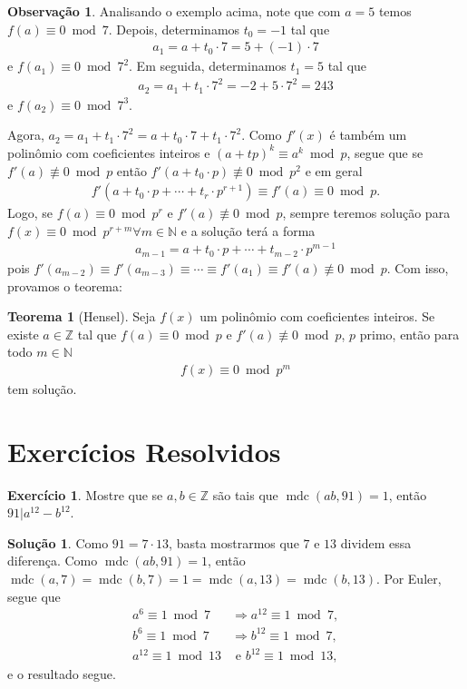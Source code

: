 \documentclass[a4paper,11pt,twoside, leqno]{article}
\DeclareMathOperator{\mdc}{mdc}
\theoremstyle{definition}
\newtheorem{theorem}{Teorema}[section]
\newtheorem{remark}{Observação}[section]
\newtheorem{exercise}{Exercício}
\newtheorem*{solution}{Solução}
\begin{document}
\begin{remark}
	Analisando o exemplo acima, note que com $a = 5$ temos $f(a)\equiv 0\bmod 7$. Depois, determinamos $t_0 = -1$ tal que 
	\begin{align*}
	a_1 = a + t_0\cdot 7 = 5 + (-1)\cdot 7
	\end{align*}
	e $f(a_1)\equiv 0\bmod 7^2$. Em seguida, determinamos $t_1 = 5$ tal que
	\begin{align*}
	a_2 = a_1 + t_1\cdot 7^2 = -2 + 5\cdot 7^2 = 243
	\end{align*}
	e $f(a_2)\equiv 0\bmod 7^3$. 
	\par\vspace{0.3cm} Agora, $a_2 = a_1 + t_1\cdot 7^2 = a + t_0\cdot 7 + t_1\cdot 7^2$. Como $f'(x)$ é também um polinômio com coeficientes inteiros e $(a + tp)^k\equiv a^k\bmod p$, segue que se $f'(a)\not\equiv 0\bmod p$ então $f'(a + t_0\cdot p)\not\equiv 0\bmod p^2$ e em geral
	\begin{align*}
	f'(a + t_0\cdot p + \cdots + t_r\cdot p^{r+1}) \equiv f'(a)\equiv 0\bmod p.
	\end{align*}
	Logo, se $f(a)\equiv 0\bmod p^r$ e $f'(a)\not\equiv 0\bmod p$, sempre teremos solução para $f(x)\equiv 0\bmod p^{r+m}\forall m\in\mathbb{N}$ e a solução terá a forma
	\begin{align*}
	a_{m-1} = a + t_0\cdot p + \cdots + t_{m-2}\cdot p^{m-1}
	\end{align*}
	pois $f'(a_{m-2})\equiv f'(a_{m-3})\equiv\cdots\equiv f'(a_1)\equiv f'(a)\not\equiv 0\bmod p$. Com isso, provamos o teorema:
\end{remark}
\begin{theorem}[Hensel]
	\label{teorema hensel}
	Seja $f(x)$ um polinômio com coeficientes inteiros. Se existe $a\in\mathbb{Z}$ tal que $f(a)\equiv 0\bmod p$ e $f'(a)\not\equiv 0\bmod p$, $p$ primo, então para todo $m\in\mathbb{N}$
	\begin{align*}
	f(x)\equiv 0\bmod p^m
	\end{align*}
	tem solução.
\end{theorem}
\section{Exercícios Resolvidos}
\begin{exercise}
	Mostre que se $a,b\in\mathbb{Z}$ são tais que $\mdc(ab,91) = 1$, então $91|a^{12} - b^{12}$.
\end{exercise}
\begin{solution}
	Como $91 = 7\cdot 13$, basta mostrarmos que $7$ e $13$ dividem essa diferença. Como $\mdc(ab,91) = 1$, então $\mdc(a,7) = \mdc(b,7) = 1 = \mdc(a,13) = \mdc(b,13)$. Por Euler, segue que
	\begin{align*}
	a^6\equiv 1\bmod 7&\Rightarrow a^{12}\equiv 1\bmod 7, \\
	b^6\equiv 1\bmod 7&\Rightarrow b^{12}\equiv 1\bmod 7, \\
	a^{12}\equiv 1\bmod 13&\text{ e } b^{12}\equiv 1\bmod 13, 
	\end{align*}
	e o resultado segue.
\end{solution}
\end{document}
